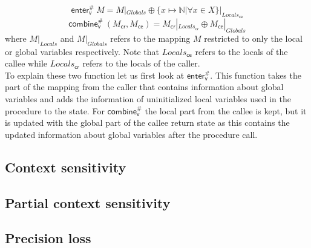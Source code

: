     \[\textsf{enter}^{\#}_\textsf{v}\ M = M|_{Globals} \oplus \{x \mapsto \mathbb{N} | \forall x \in X\}|_{Locals_\textsf{ce}} \]
    \[\textsf{combine}^{\#}_\textsf{v}\ (M_\textsf{cr}, M_\textsf{ce}) = M_\textsf{cr}|_{Locals_\textsf{cr}} \oplus M_\textsf{ce}|_{Globals} \]
    where $M|_{Locals}$ and $M|_{Globals}$ refers to the mapping $M$ restricted to only the local or global variables respectively. Note that $Locals_\textsf{ce}$ refers to the locals of the callee while $Locals_\textsf{cr}$ refers to the locals of the caller.\\
    To explain these two function let us first look at $\textsf{enter}^{\#}_\textsf{v}$. This function takes the part of the mapping from the caller that contains information about global variables and adds the information of uninitialized local variables used in the procedure to the state. For $\textsf{combine}^{\#}_\textsf{v}$ the local part from the callee is kept, but it is updated with the global part of the callee return state as this contains the updated information about global variables after the procedure call.\\

    \subsection{Context sensitivity}

    \subsection{Partial context sensitivity}

    \subsection{Precision loss}
    
  



